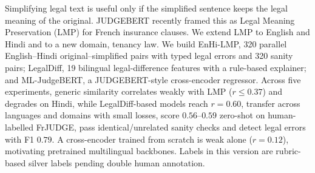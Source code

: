 Simplifying legal text is useful only if the simplified sentence keeps the legal meaning of the original. JUDGEBERT recently framed this as Legal Meaning Preservation (LMP) for French insurance clauses. We extend LMP to English and Hindi and to a new domain, tenancy law. We build EnHi-LMP, 320 parallel English--Hindi original--simplified pairs with typed legal errors and 320 sanity pairs; LegalDiff, 19 bilingual legal-difference features with a rule-based explainer; and ML-JudgeBERT, a JUDGEBERT-style cross-encoder regressor. Across five experiments, generic similarity correlates weakly with LMP ($r\le0.37$) and degrades on Hindi, while LegalDiff-based models reach $r=0.60$, transfer across languages and domains with small losses, score $0.56$--$0.59$ zero-shot on human-labelled FrJUDGE, pass identical/unrelated sanity checks and detect legal errors with F1 $0.79$. A cross-encoder trained from scratch is weak alone ($r=0.12$), motivating pretrained multilingual backbones. Labels in this version are rubric-based silver labels pending double human annotation.
